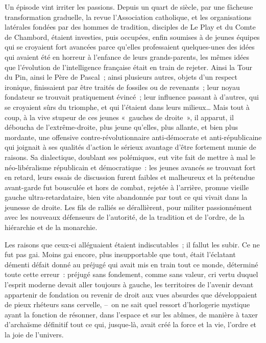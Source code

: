 \documentclass[french,twoside]{book} %
\begin{document}
Un épisode vint irriter les passions. Depuis un quart de siècle, par une fâcheuse transformation graduelle, la revue l’Association catholique, et les organisations latérales fondées par des hommes de tradition, disciples de Le Play et du Comte de Chambord, étaient investies, puis occupées, enfin soumises à de jeunes équipes qui se croyaient fort avancées parce qu’elles professaient quelques-unes des idées qui avaient été en horreur à l’enfance de leurs grands-parents, les mêmes idées que l’évolution de l’intelligence française était en train de rejeter. Ainsi la Tour du Pin, ainsi le Père de Pascal ; ainsi plusieurs autres, objets d’un respect ironique, finissaient par être traités de fossiles ou de revenants ; leur noyau fondateur se trouvait pratiquement évincé ; leur influence passant à d’autres, qui se croyaient sûrs du triomphe, et qui l’étaient dans leurs milieux… Mais tout à coup, à la vive stupeur de ces jeunes « gauches de droite », il apparut, il déboucha de l’extrême-droite, plus jeune qu’elles, plus allante, et bien plus mordante, une offensive contre-révolutionnaire anti-démocrate et anti-républicaine qui joignait à ses qualités d’action le sérieux avantage d’être fortement munie de raisons. Sa dialectique, doublant ses polémiques, eut vite fait de mettre à mal le néo-libéralisme républicain et démocratique : les jeunes avancés se trouvant fort en retard, leurs essais de discussion furent faibles et malheureux et la prétendue avant-garde fut bousculée et hors de combat, rejetée à l’arrière, promue vieille gauche ultra-retardataire, bien vite abandonnée par tout ce qui vivait dans la jeunesse de droite. Les fils de ralliés se dérallièrent, pour militer passionnément avec les nouveaux défenseurs de l’autorité, de la tradition et de l’ordre, de la hiérarchie et de la monarchie.\par
Les raisons que ceux-ci alléguaient étaient indiscutables ; il fallut les subir. Ce ne fut pas gai. Moins gai encore, plus insupportable que tout, était l’éclatant démenti défait donné au préjugé qui avait mis en train tout ce monde, déterminé toute cette erreur : préjugé sans fondement, comme sans valeur, cri vertu duquel l’esprit moderne devait aller toujours à gauche, les territoires de l’avenir devant appartenir de fondation ou revenir de droit aux vues absurdes que développaient de pieux rhéteurs sans cervelle, – on ne sait quel ressort d’horlogerie mystique ayant la fonction de résonner, dans l’espace et sur les abîmes, de manière à taxer d’archaïsme définitif tout ce qui, jusque-là, avait créé la force et la vie, l’ordre et la joie de l’univers.\par
\end{document}
